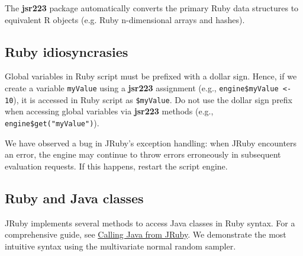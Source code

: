 \documentclass[
article,
11pt, %
a4paper, %
oneside, %
headinclude,footinclude, %
]{scrartcl}
\theoremstyle{definition} %
\theoremstyle{plain} %
\theoremstyle{remark} %
\newcommand{\pkg}[1]{\textbf{#1}}
\newcommand{\code}[1]{\texttt{#1}}
\begin{document}
The \pkg{jsr223} package automatically converts the primary Ruby data structures to equivalent R objects (e.g. Ruby n-dimensional arrays and hashes).

\subsection{Ruby idiosyncrasies}

Global variables in Ruby script must be prefixed with a dollar sign. Hence, if we create a variable \code{myValue} using a \pkg{jsr223} assignment (e.g., \code{engine\$myValue <-\, 10}), it is accessed in Ruby script as \code{\$myValue}. Do not use the dollar sign prefix when accessing global variables via \pkg{jsr223} methods (e.g., \code{engine\$get("myValue")}).

We have observed a bug in JRuby's exception handling: when JRuby encounters an error, the engine may continue to throw errors erroneously in subsequent evaluation requests. If this happens, restart the script engine.

\subsection{Ruby and Java classes}

JRuby implements several methods to access Java classes in Ruby syntax. For a comprehensive guide, see \href{https://github.com/jruby/jruby/wiki/CallingJavaFromJRuby}{Calling Java from JRuby}. We demonstrate the most intuitive syntax using the multivariate normal random sampler.
\end{document}
